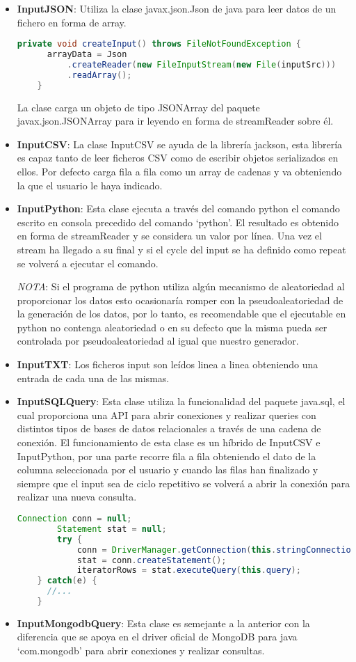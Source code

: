 \begin{itemize}
  \item \textbf{InputJSON}: Utiliza la clase javax.json.Json de java para leer datos de un fichero en forma de array.

  \begin{lstlisting}[language=java]
    private void createInput() throws FileNotFoundException {
      arrayData = Json
          .createReader(new FileInputStream(new File(inputSrc)))
          .readArray();
    }
  \end{lstlisting}

  La clase carga un objeto de tipo JSONArray del paquete javax.json.JSONArray para ir leyendo en forma de streamReader sobre él.
  \item \textbf{InputCSV}: La clase InputCSV se ayuda de la librería jackson, esta librería es capaz tanto de leer ficheros CSV como de escribir objetos serializados en ellos. Por defecto carga fila a fila como un array de cadenas y va obteniendo la que el usuario le haya indicado.
  \item \textbf{InputPython}: Esta clase ejecuta a través del comando python el comando escrito en consola precedido del comando `python'. El resultado es obtenido en forma de streamReader y se considera un valor por línea. Una vez el stream ha llegado a su final y si el cycle del input se ha definido como repeat se volverá a ejecutar el comando.

  \emph{NOTA}: Si el programa de python utiliza algún mecanismo de aleatoriedad al proporcionar los datos esto ocasionaría romper con la pseudoaleatoriedad de la generación de los datos, por lo tanto, es recomendable que el ejecutable en python no contenga aleatoriedad o en su defecto que la misma pueda ser controlada por pseudoaleatoriedad al igual que nuestro generador.
  \item \textbf{InputTXT}: Los ficheros input son leídos linea a linea obteniendo una entrada de cada una de las mismas.
  \item \textbf{InputSQLQuery}: Esta clase utiliza la funcionalidad del paquete java.sql, el cual proporciona una API para abrir conexiones y realizar queries con distintos tipos de bases de datos relacionales a través de una cadena de conexión. El funcionamiento de esta clase es un híbrido de InputCSV e InputPython, por una parte recorre fila a fila obteniendo el dato de la columna seleccionada por el usuario y cuando las filas han finalizado y siempre que el input sea de ciclo repetitivo se volverá a abrir la conexión para realizar una nueva consulta.
  \begin{lstlisting}[language=java]
    Connection conn = null;
		Statement stat = null;
		try {
			conn = DriverManager.getConnection(this.stringConnection);
			stat = conn.createStatement();
			iteratorRows = stat.executeQuery(this.query);
    } catch(e) {
      //...
    }
  \end{lstlisting}
  \item \textbf{InputMongodbQuery}: Esta clase es semejante a la anterior con la diferencia que se apoya en el driver oficial de MongoDB para java `com.mongodb' para abrir conexiones y realizar consultas.
\end{itemize}

